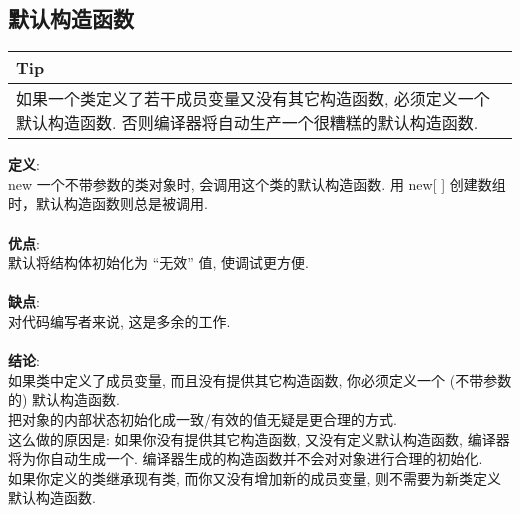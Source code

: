 \documentclass[a4paper,11pt,CJK]{article}
\begin{document}
\begin{CJK}{UTF8}{gbsn}
\subsection{默认构造函数}
\begin{table}[htbp]
\flushleft
\begin{tabular}{p{400pt}}
\toprule
\rowcolor[gray]{.8} Tip \\
\midrule
如果一个类定义了若干成员变量又没有其它构造函数, 必须定义一个默认构造函数. 否则编译器将自动生产一个很糟糕的默认构造函数.\\
\bottomrule
\end{tabular}
\end{table}
\noindent
\textbf{定义}:\\
\indent new 一个不带参数的类对象时, 会调用这个类的默认构造函数. 用 new[ ] 创建数组时，默认构造函数则总是被调用.\\
\\
\textbf{优点}:\\
\indent 默认将结构体初始化为 “无效” 值, 使调试更方便.\\
\\
\textbf{缺点}:\\
\indent 对代码编写者来说, 这是多余的工作.\\
\\
\textbf{结论}:\\
\indent 如果类中定义了成员变量, 而且没有提供其它构造函数, 你必须定义一个 (不带参数的) 默认构造函数. \\
\indent 把对象的内部状态初始化成一致/有效的值无疑是更合理的方式.\\
\indent 这么做的原因是: 如果你没有提供其它构造函数, 又没有定义默认构造函数, 编译器将为你自动生成一个. 编译器生成的构造函数并不会对对象进行合理的初始化.\\
\indent 如果你定义的类继承现有类, 而你又没有增加新的成员变量, 则不需要为新类定义默认构造函数.\\


\end{CJK}
\end{document}
